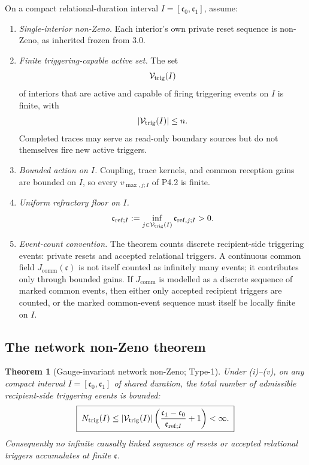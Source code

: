 \documentclass[11pt,a4paper]{article}
\theoremstyle{definition}
\theoremstyle{plain}
\newtheorem{theorem}[definition]{Theorem}
\theoremstyle{remark}
\begin{document}
On a compact relational-duration interval \(I=[\mathfrak c_0,\mathfrak c_1]\),
assume:
\begin{enumerate}[label=\textup{(\roman*)},leftmargin=1.2cm]
\item \emph{Single-interior non-Zeno.} Each interior's own private reset sequence is
non-Zeno, as inherited frozen from 3.0.
\item \emph{Finite triggering-capable active set.} The set
\[
\mathcal V_{\rm trig}(I)
\]
of interiors that are active and capable of firing triggering events on \(I\) is
finite, with
\[
|\mathcal V_{\rm trig}(I)|\le n.
\]
Completed traces may serve as read-only boundary sources but do not themselves
fire new active triggers.
\item \emph{Bounded action on \(I\).} Coupling, trace kernels, and common reception
gains are bounded on \(I\), so every \(v_{\max,j;I}\) of P4.2 is finite.
\item \emph{Uniform refractory floor on \(I\).}
\[
\mathfrak c_{\mathrm{ref};I}
:=
\inf_{j\in\mathcal V_{\rm trig}(I)}
\mathfrak c_{\mathrm{ref},j;I}
>0.
\]
\item \emph{Event-count convention.} The theorem counts discrete recipient-side
triggering events: private resets and accepted relational triggers. A continuous
common field \(J_{\mathrm{comm}}(\mathfrak c)\) is not itself counted as infinitely
many events; it contributes only through bounded gains. If \(J_{\mathrm{comm}}\) is
modelled as a discrete sequence of marked common events, then either only accepted
recipient triggers are counted, or the marked common-event sequence must itself be
locally finite on \(I\).
\end{enumerate}

\subsection{The network non-Zeno theorem}

\begin{theorem}[Gauge-invariant network non-Zeno; Type-1]\label{thm:nonzeno}
Under \textup{(i)--(v)}, on any compact interval
\(I=[\mathfrak c_0,\mathfrak c_1]\) of shared duration, the total number of
admissible recipient-side triggering events is bounded:
\[
\boxed{\;
N_{\mathrm{trig}}(I)
\le
|\mathcal V_{\rm trig}(I)|
\left(
\frac{\mathfrak c_1-\mathfrak c_0}{\mathfrak c_{\mathrm{ref};I}}+1
\right)
<\infty.
\;}
\]
Consequently no infinite causally linked sequence of resets or accepted relational
triggers accumulates at finite \(\mathfrak c\).
\end{theorem}
\end{document}
